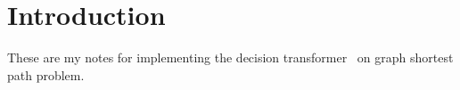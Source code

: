 \section{Introduction}
\label{sec:intro}

These are my notes for implementing the decision
transformer~\cite{chen2021decision} on graph shortest path problem.